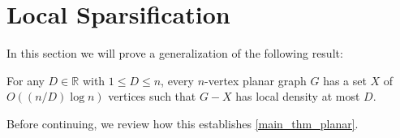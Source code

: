 \documentclass{patmorin}
\renewcommand{\le}{\leqslant}
\renewcommand{\leq}{\leqslant}
\newcommand{\david}[1]{{\color{orange} David: #1}}
\newcommand{\pat}[1]{\textcolor{Blue}{Pat: #1}}
\begin{document}
%
%




\section{Local Sparsification}
\label{local_sparsification_section}

In this section we will prove a generalization of the following result:

\begin{lem}\label{planar_sparsifier}
  For any $D\in\mathbb{R}$ with $1\leq D\leq n$, every $n$-vertex planar graph $G$ has a set $X$ of $O((n/D)\log n)$ vertices such that $G-X$ has local density at most $D$.
\end{lem}

Before continuing, we review how this establishes \cref{main_thm_planar}.
%
%
%
\end{document}
